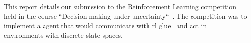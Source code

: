 This report details our submission to the Reinforcement Learning competition held in the course ``Decision making under uncertainty``~\cite{RLCOMP}. The competition was to implement a agent that would communicate with rl glue~\cite{rl-glue} and act in environments with discrete state spaces.
